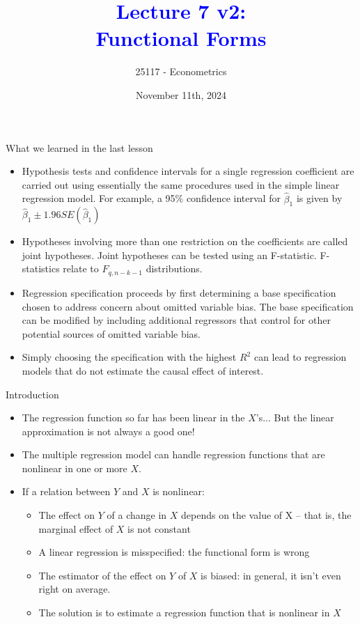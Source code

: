 \documentclass[notes,10pt, aspectratio=169]{beamer}
\title[]{\textcolor{blue}{Lecture 7 v2:\\Functional Forms}}
\author{25117 - Econometrics}
\institute[shortinst]{Universitat Pompeu Fabra}
\date{November 11th, 2024}
\begin{document}
\begin{frame}[plain]
\maketitle
\end{frame}


\begin{frame}{What we learned in the last lesson}
\begin{itemize}
    \item Hypothesis tests and confidence intervals for a single regression coefficient are carried out using essentially the same procedures used in the simple linear regression model. For example, a 95\% confidence interval for $\hat{\beta}_1$ is given by $\hat{\beta}_1\pm 1.96 SE(\hat{\beta}_1)$\\[1em]
    \item Hypotheses involving more than one restriction on the coefficients are called joint hypotheses. Joint hypotheses can be tested using an F-statistic. F-statistics relate to $F_{q,n-k-1}$ distributions. \\[1em]
    \item Regression specification proceeds by first determining a base specification chosen to address concern about omitted variable bias. The base specification can be modified by including additional regressors that control for other potential sources of omitted variable bias.\\[1em]
    \item Simply choosing the specification with the highest $R^2$ can lead to regression models that do not estimate the causal effect of interest.
\end{itemize}
\end{frame}

\begin{frame}{Introduction}
\begin{itemize}
    \item The regression function so far has been linear in the $X$’s... But the linear approximation is not always a good one!\\[1em]
    \item The multiple regression model can handle regression functions that are nonlinear in one or more $X$.\\[1em]
    \item If a relation between $Y$ and $X$ is nonlinear:
    \begin{itemize}
        \item The effect on $Y$ of a change in $X$ depends on the value of   X – that is, the marginal effect of $X$ is not constant
        \item A linear regression is misspecified: the functional form is wrong
        \item The estimator of the effect on $Y$ of $X$ is biased: in general, it isn’t even right on average.
        \item The solution is to estimate a regression function that is nonlinear in $X$
    \end{itemize}
\end{itemize}
\end{frame}
\end{document}

